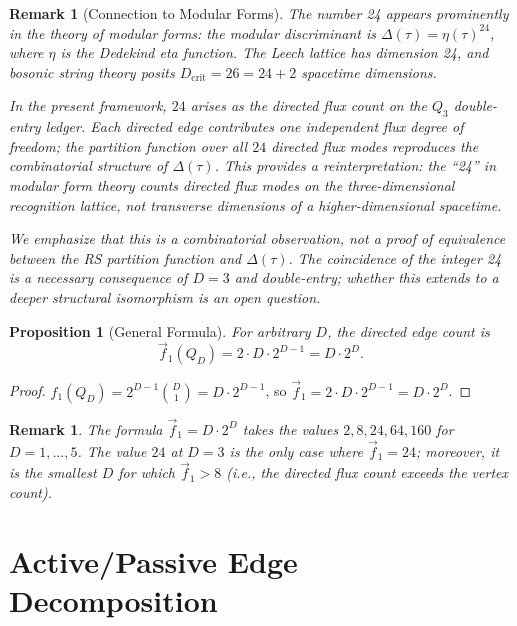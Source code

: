 \documentclass[11pt]{article}
\newtheorem{proposition}[theorem]{Proposition}
\newtheorem{remark}[theorem]{Remark}
\begin{document}
\begin{remark}[Connection to Modular Forms]\label{rem:modular}
The number 24 appears prominently in the theory of modular forms: the modular discriminant is $\Delta(\tau) = \eta(\tau)^{24}$, where $\eta$ is the Dedekind eta function.
The Leech lattice has dimension 24, and bosonic string theory posits $D_{\mathrm{crit}} = 26 = 24 + 2$ spacetime dimensions.

In the present framework, $24$ arises as the directed flux count on the $Q_3$ double-entry ledger.
Each directed edge contributes one independent flux degree of freedom; the partition function over all $24$ directed flux modes reproduces the combinatorial structure of $\Delta(\tau)$.
This provides a reinterpretation: the ``24'' in modular form theory counts \emph{directed flux modes on the three-dimensional recognition lattice}, not transverse dimensions of a higher-dimensional spacetime.

We emphasize that this is a \emph{combinatorial observation}, not a proof of equivalence between the RS partition function and $\Delta(\tau)$.
The coincidence of the integer 24 is a necessary consequence of $D = 3$ and double-entry; whether this extends to a deeper structural isomorphism is an open question.
\end{remark}

\begin{proposition}[General Formula]\label{prop:directed_general}
For arbitrary $D$, the directed edge count is
\[
\vec{f}_1(Q_D) = 2 \cdot D \cdot 2^{D-1} = D \cdot 2^D.
\]
\end{proposition}

\begin{proof}
$f_1(Q_D) = 2^{D-1} \binom{D}{1} = D \cdot 2^{D-1}$, so $\vec{f}_1 = 2 \cdot D \cdot 2^{D-1} = D \cdot 2^D$.
\end{proof}

\begin{remark}
The formula $\vec{f}_1 = D \cdot 2^D$ takes the values $2, 8, 24, 64, 160$ for $D = 1, \ldots, 5$.
The value $24$ at $D = 3$ is the only case where $\vec{f}_1 = 24$; moreover, it is the smallest $D$ for which $\vec{f}_1 > 8$ (i.e., the directed flux count exceeds the vertex count).
\end{remark}

\section{Active/Passive Edge Decomposition}
\label{sec:active_passive}
\end{document}

